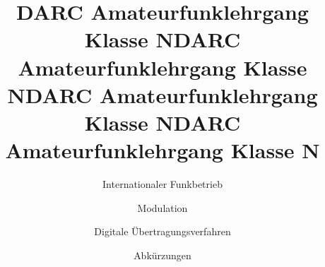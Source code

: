 \documentclass[aspectratio = 169]{beamer}
\begin{document}
\title{DARC Amateurfunklehrgang Klasse N}
\author{Internationaler Funkbetrieb}
\begin{frame}
\maketitle
\end{frame}





\title{DARC Amateurfunklehrgang Klasse N}
\author{Modulation}
\begin{frame}
\maketitle
\end{frame}









\title{DARC Amateurfunklehrgang Klasse N}
\author{Digitale Übertragungsverfahren}
\begin{frame}
\maketitle
\end{frame}






\title{DARC Amateurfunklehrgang Klasse N}
\author{Abkürzungen}
\begin{frame}
\maketitle
\end{frame}



\end{document}
